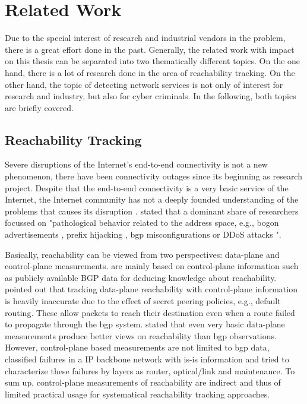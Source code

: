 \section{Related Work 
\label{sec:related_work}}
Due to the special interest of research and industrial vendors in the problem, there is a great effort done in the past. 
Generally, the related work with impact on this thesis can be separated into two thematically different topics.
On the one hand, there is a lot of research done in the area of reachability tracking. 
On the other hand, the topic of detecting network services is not only of interest for research and industry, but also for cyber criminals. 
In the following, both topics are briefly covered. 

\subsection{Reachability Tracking}

Severe disruptions of the Internet's end-to-end connectivity is not a new phenomenon, there have been connectivity outages since its beginning as research project. 
Despite that the end-to-end connectivity is a very basic service of the Internet, the Internet community has not a deeply founded understanding of the problems that causes its disruption \citep{Bush:Optometry}.
\citet{Bush:Optometry} stated that a dominant share of researchers focussed on "pathological behavior related to the address space, e.g., bogon advertisements \citep{Feamster:2005}, prefix hijacking \citep{Zhang:2010}, \gls{bgp} misconfigurations \citep{Mahajan:2002} or \gls{DDoS} attacks \citep{Chen:2001}".

Basically, reachability can be viewed from two perspectives: \gls{data-plane} and \gls{control-plane} measurements. \citep{Feamster:2005,Zhang:2010,Mahajan:2002,Chen:2001} are mainly based on \gls{control-plane} information such as publicly available BGP data for deducing knowledge about reachability. 
\citet{Bush:Optometry} pointed out that tracking \gls{data-plane} reachability with \gls{control-plane} information is heavily inaccurate due to the effect of secret peering policies, e.g., default routing. 
These allow packets to reach their destination even when a route failed to propagate through the \gls{bgp} system. 
\citet{Bush:Optometry} stated that even very basic \gls{data-plane} measurements
produce better views on reachability than \gls{bgp} observations. 
However, \gls{control-plane} based measurements are not limited to \gls{bgp} data, \citet{Markopoulou:2008} classified failures in a IP backbone network with \gls{is-is} information and tried to characterize these failures by layers as router, optical/link and maintenance. 
To sum up, \gls{control-plane} measurements of reachability are indirect and thus of limited practical usage for systematical reachability tracking approaches.

